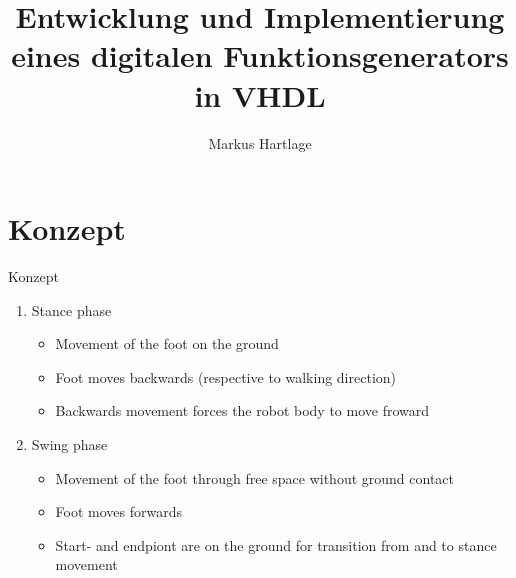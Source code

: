 \documentclass[11pt]{beamer}
\author{Markus Hartlage}
\title[Entwicklung und Implementierung eines digitalen Funktionsgenerators in VHDL]{Entwicklung und Implementierung eines digitalen Funktionsgenerators in VHDL}
\institute{FH-Bielefeld}
\begin{document}
\begin{frame}
\titlepage
\end{frame}



\section{Konzept}
\begin{frame}{Konzept}

\begin{enumerate}
	\item Stance phase
	\begin{itemize}
		\item Movement of the foot on the ground
		\item Foot moves backwards (respective to walking direction)
		\item Backwards movement forces the robot body to move froward
	\end{itemize}
	\item Swing phase
	\begin{itemize}
		\item Movement of the foot through free space without ground contact
		\item Foot moves forwards 
		\item Start- and endpiont are on the ground for transition from and to stance movement
	\end{itemize}
\end{enumerate}
\end{frame}
\end{document}
